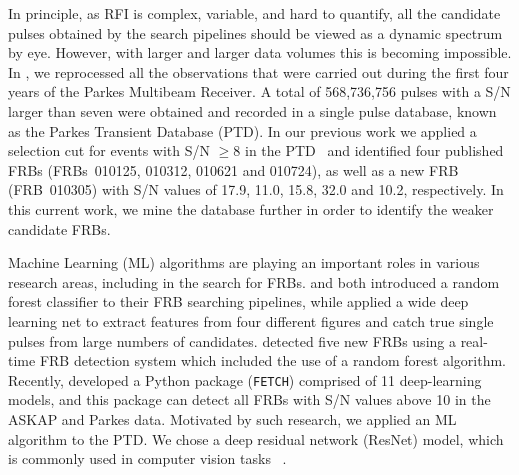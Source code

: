 \documentclass[fleqn,usenatbib]{mnras}
\begin{document}
In principle, as RFI is complex, variable, and hard to quantify, all the candidate pulses obtained by the search pipelines should be viewed as a dynamic spectrum by eye. However, with larger and larger data volumes this is becoming impossible. 
In \citet{Zhang_2020}, we reprocessed all the observations that were carried out during the first four years of the Parkes Multibeam Receiver. A total of 568,736,756 pulses with a S/N larger than seven were obtained and recorded in a single pulse database, known as the Parkes Transient Database (PTD). 
In our previous work we applied a selection cut for events with S/N $\geq8$ in the PTD~\citep[see usage details in][]{Zhang_2020} and identified four published FRBs (FRBs~010125, 010312, 010621 and 010724), as well as a new FRB (FRB~010305) with S/N values of 17.9, 11.0, 15.8, 32.0 and 10.2, respectively. 
In this current work, we mine the database further in order to identify the weaker candidate FRBs.


Machine Learning (ML) algorithms are playing  an important roles in various research areas, including in the search for FRBs. %
\citet{wagstaff} and \citet{foster_ml} both introduced a random forest classifier to their FRB searching pipelines, while \citet{connor} applied a wide deep learning net to extract features from four different figures and catch true single pulses from large numbers of candidates. 
\citet{stz1748} detected five new FRBs using a real-time FRB detection system which included the use of a random forest algorithm. Recently, \cite{FETCH} developed a Python package (\texttt{FETCH}) comprised of 11 deep-learning models, and this package can detect all FRBs with S/N values above 10 in the ASKAP and Parkes data.
%
Motivated by such research, we applied an ML algorithm to the PTD. We chose a deep residual network (ResNet) model, which is commonly used in computer vision tasks ~\citep{heresnet}.
%
%
\end{document}
